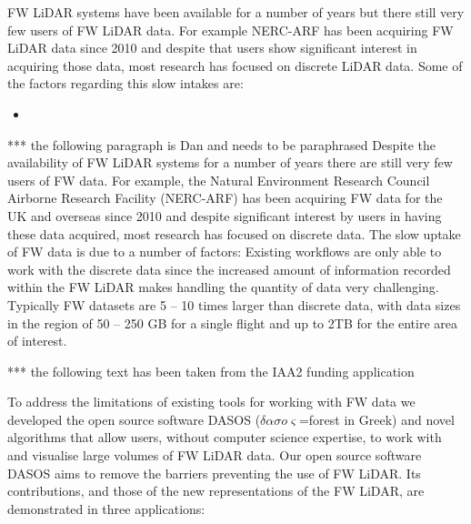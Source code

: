\documentclass{subfiles}
\begin{document}
\par FW LiDAR systems have been available for a number of years but there still very few users of FW LiDAR data. For example NERC-ARF has been acquiring FW LiDAR data since 2010 and despite that users show significant interest in acquiring those data, most research has focused on discrete LiDAR data. Some of the factors regarding this slow intakes are:

\begin{itemize}
	\item 
\end{itemize}

	\par {\color{red} *** the following paragraph is Dan and needs to be paraphrased}
Despite the availability of FW LiDAR systems for a number of years there are still very few users of FW data. For example, the Natural Environment Research Council Airborne Research Facility (NERC-ARF) has been acquiring FW data for the UK and overseas since 2010 and despite significant interest by users in having these data acquired, most research has focused on discrete data. The slow uptake of FW data is due to a number of factors: Existing workflows are only able to work with the discrete data since the increased amount of information recorded within the FW LiDAR makes handling the quantity of data very challenging. Typically FW datasets are 5 – 10 times larger than discrete data, with data sizes in the region of 50 – 250 GB for a single flight and up to 2TB for the entire area of interest.




	\par {\color{red} *** the following text has been taken from the IAA2 funding application}
	
\par To address the limitations of existing tools for working with FW data we developed the open source software DASOS ($\delta \alpha \sigma o \varsigma$=forest in Greek) and novel algorithms that allow users, without computer science expertise, to work with and visualise large volumes of FW LiDAR data. Our open source software DASOS aims to remove the barriers preventing the use of FW LiDAR. Its contributions, and those of the new representations of the FW LiDAR, are demonstrated in 
three applications:
\end{document}
